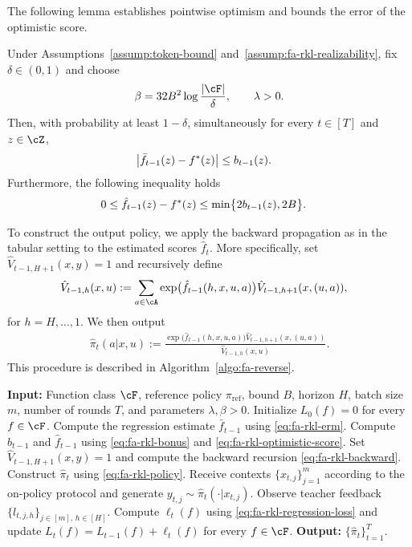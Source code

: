 \documentclass[11pt]{article}
\newcommand{\piref}{\pi_{\text{ref}}}
\begin{document}
The following lemma establishes pointwise optimism and
bounds the error of the optimistic score.
\begin{lemma}
\label{lem:fa-rkl-optimism}
Under Assumptions~\ref{assump:token-bound}
and~\ref{assump:fa-rkl-realizability}, fix $\delta\in(0,1)$
and choose
\begin{align*}
    \beta
    =
    32B^2\log\frac{|\cF|}{\delta},
    \qquad \lambda>0.
\end{align*}
Then, with probability at least $1-\delta$, simultaneously for
every $t\in[T]$ and $z\in\cZ$,
\begin{align}
    \big|\bar f_{t-1}(z)-f^*(z)\big|
    &\leq b_{t-1}(z).
    \notag
\end{align}
Furthermore, the following inequality holds
\begin{align}
    0
    \leq \hat f_{t-1}(z)-f^*(z)
    &\leq
    \min\bigl\{2b_{t-1}(z),2B\bigr\}.
    \notag
\end{align}
\end{lemma}
To construct the output policy, we apply the backward
propagation as in the tabular setting to the estimated scores $\hat f_t$. More specifically, set $\hat V_{t-1,H+1}(x,y)=1$ and recursively define
\begin{align}
    \hat V_{t-1,h}(x,u)
    &:=
    \sum_{a\in\cA}
    \exp\bigl(\hat f_{t-1}(h,x,u,a)\bigr)
    \hat V_{t-1,h+1}(x,(u,a)),
    \label{eq:fa-rkl-backward}
\end{align}
for $h=H,\ldots,1$. We then output
\begin{align}
    \hat\pi_t(a|x,u)
    :=
    \frac{
        \exp\bigl(\hat f_{t-1}(h,x,u,a)\bigr)
        \hat V_{t-1,h+1}(x,(u,a))
    }{
        \hat V_{t-1,h}(x,u)
    }.
    \label{eq:fa-rkl-policy}
\end{align}
This procedure is described in Algorithm~\ref{algo:fa-reverse}.
\begin{algorithm}[H]
\caption{Optimistic Reverse KL with Function Approximation}
\label{algo:fa-reverse}
\begin{algorithmic}[1]
    \STATE \textbf{Input:}
    Function class $\cF$, reference policy $\piref$,
    bound $B$, horizon $H$, batch size $m$,
    number of rounds $T$, and parameters $\lambda,\beta>0$.
    \STATE Initialize $L_0(f)=0$ for every $f\in\cF$.
        \STATE Compute the regression estimate $\bar f_{t-1}$
        using \eqref{eq:fa-rkl-erm}.
        \STATE Compute $b_{t-1}$ and $\hat f_{t-1}$
        using \eqref{eq:fa-rkl-bonus}
        and \eqref{eq:fa-rkl-optimistic-score}.
        \STATE Set $\hat V_{t-1,H+1}(x,y)=1$
        and compute the backward recursion
        \eqref{eq:fa-rkl-backward}.
        \STATE Construct $\hat\pi_t$ using
        \eqref{eq:fa-rkl-policy}.
        \STATE Receive contexts $\{x_{t,j}\}_{j=1}^{m}$
        according to the on-policy protocol and generate
        $y_{t,j}\sim\hat\pi_t(\cdot|x_{t,j})$.
        \STATE Observe teacher feedback
        $\{l_{t,j,h}\}_{j\in[m],\,h\in[H]}$.
        \STATE Compute $\ell_t(f)$ using
        \eqref{eq:fa-rkl-regression-loss} and update
        $L_t(f)=L_{t-1}(f)+\ell_t(f)$
        for every $f\in\cF$.
    \ENDFOR
    \STATE \textbf{Output:} $\{\hat\pi_t\}_{t=1}^{T}$.
\end{algorithmic}
\end{algorithm}
\end{document}
